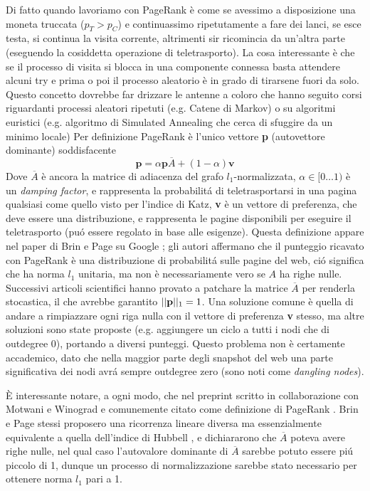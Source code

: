 Di fatto quando lavoriamo con PageRank è come se avessimo a disposizione una moneta truccata ($p_T >
p_C$) e continuassimo ripetutamente a fare dei lanci, se esce testa, si continua la visita corrente,
altrimenti sir ricomincia da un'altra parte (eseguendo la cosiddetta operazione di teletrasporto). La cosa interessante è che se il processo di visita si blocca in una componente connessa basta attendere alcuni try e prima o poi il processo aleatorio è in grado di tirarsene fuori da solo. Questo concetto dovrebbe far drizzare le antenne a coloro che hanno seguito corsi riguardanti processi aleatori ripetuti (e.g. Catene di Markov) o su algoritmi euristici (e.g. algoritmo di Simulated Annealing che cerca di sfuggire da un minimo locale)
Per definizione PageRank è l'unico vettore \textbf{p} (autovettore dominante) soddisfacente
\begin{equation}
    \textbf{p} = \alpha\textbf{p}\overline{A} + (1 - \alpha)\textbf{v}
\end{equation}
Dove $\overline{A}$ è ancora la matrice di adiacenza del grafo $l_1$-normalizzata, $\alpha \in [0\dots1)$ è un \textit{damping factor}, e rappresenta la probabilitá di teletrasportarsi in una pagina qualsiasi come quello visto per l'indice di Katz, \textbf{v} è un vettore di preferenza, che deve essere una distribuzione, e rappresenta le pagine disponibili per eseguire il teletrasporto (puó essere regolato in base alle esigenze). Questa definizione appare nel paper di Brin e Page su Google \cite{google}; gli autori affermano che il punteggio ricavato con PageRank è una distribuzione di probabilitá sulle pagine del web, ció significa che ha norma $l_1$ unitaria, ma non è necessariamente vero se $A$ ha righe nulle. Successivi articoli scientifici hanno provato a patchare la matrice $\overline{A}$ per renderla stocastica, il che avrebbe garantito $\lvert\lvert \textbf{p} \rvert\rvert_1 = 1$. Una soluzione comune è quella di andare a rimpiazzare ogni riga nulla con il vettore di preferenza \textbf{v} stesso, ma altre soluzioni sono state proposte (e.g. aggiungere un ciclo a tutti i nodi che di outdegree 0), portando a diversi punteggi. Questo problema non è certamente accademico, dato che nella maggior parte degli snapshot del web una parte significativa dei nodi avrá sempre outdegree zero (sono noti come \textit{dangling nodes}).

È interessante notare, a ogni modo, che nel preprint scritto in collaborazione con Motwani e Winograd e comunemente citato come definizione di PageRank \cite{prankpreprint}. Brin e Page stessi proposero una ricorrenza lineare diversa ma essenzialmente equivalente a quella dell'indice di Hubbell \cite{hub}, e dichiararono che $\overline{A}$ poteva avere righe nulle, nel qual caso l'autovalore dominante di $\overline{A}$ sarebbe potuto essere piú piccolo di 1, dunque un processo di normalizzazione sarebbe stato necessario per ottenere norma $l_1$ pari a 1.

